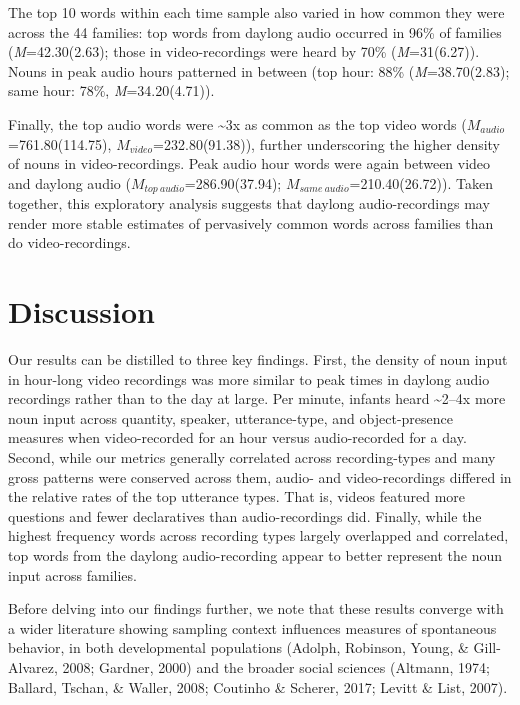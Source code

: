 \documentclass[man]{apa6}
\theoremstyle{definition}
\theoremstyle{definition}
\theoremstyle{definition}
\theoremstyle{remark}
\begin{document}
The top 10 words within each time sample also varied in how common they
were across the 44 families: top words from daylong audio occurred in
96\% of families (\emph{M}=42.30(2.63); those in video-recordings were
heard by 70\% (\emph{M}=31(6.27)). Nouns in peak audio hours patterned
in between (top hour: 88\% (\emph{M}=38.70(2.83); same hour: 78\%,
\emph{M}=34.20(4.71)).

Finally, the top audio words were \textasciitilde{}3x as common as the
top video words (\(M_{audio}\)=761.80(114.75),
\(M_{video}\)=232.80(91.38)), further underscoring the higher density of
nouns in video-recordings. Peak audio hour words were again between
video and daylong audio (\(M_{top\ audio}\)=286.90(37.94);
\(M_{same\ audio}\)=210.40(26.72)). Taken together, this exploratory
analysis suggests that daylong audio-recordings may render more stable
estimates of pervasively common words across families than do
video-recordings.

\section{Discussion}\label{discussion}

Our results can be distilled to three key findings. First, the density
of noun input in hour-long video recordings was more similar to peak
times in daylong audio recordings rather than to the day at large. Per
minute, infants heard \textasciitilde{}2--4x more noun input across
quantity, speaker, utterance-type, and object-presence measures when
video-recorded for an hour versus audio-recorded for a day. Second,
while our metrics generally correlated across recording-types and many
gross patterns were conserved across them, audio- and video-recordings
differed in the relative rates of the top utterance types. That is,
videos featured more questions and fewer declaratives than
audio-recordings did. Finally, while the highest frequency words across
recording types largely overlapped and correlated, top words from the
daylong audio-recording appear to better represent the noun input across
families.

Before delving into our findings further, we note that these results
converge with a wider literature showing sampling context influences
measures of spontaneous behavior, in both developmental populations
(Adolph, Robinson, Young, \& Gill-Alvarez, 2008; Gardner, 2000) and the
broader social sciences (Altmann, 1974; Ballard, Tschan, \& Waller,
2008; Coutinho \& Scherer, 2017; Levitt \& List, 2007).
\end{document}
